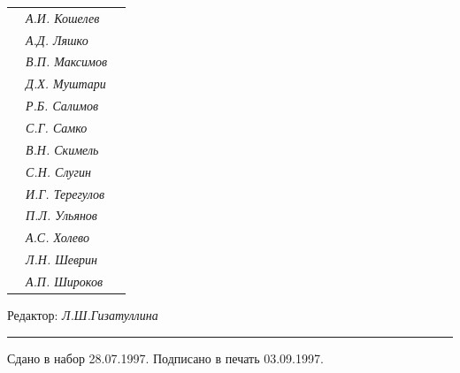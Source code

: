 \begin{tabular}{p{63mm}p{40mm}p{50mm}}
                               &   \it А.И. Кошелев  & \\


                               &   \it А.Д. Ляшко  & \\


                               &   \it В.П. Максимов  & \\


                               &   \it Д.Х. Муштари & \\


                               &   \it Р.Б. Салимов  & \\


                               &   \it С.Г. Самко  & \\


                               &   \it В.Н. Скимель &  \\


                               &   \it С.Н. Слугин  & \\


                               &   \it И.Г. Терегулов  & \\


                               &   \it П.Л. Ульянов  & \\


                               &   \it А.С. Холево  & \\


                               &   \it Л.Н. Шеврин  & \\


                               &   \it А.П. Широков & \\


\end{tabular} 


\bigskip 


\bigskip 


\bigskip 





 


\centerline{Редактор: \it Л.Ш.Гизатуллина}


\bigskip 


\hrule 


\setlength{\hoffset}{-23mm}


\bigskip


\noindent Сдано в набор 28.07.1997. Подписано в печать 03.09.1997.



